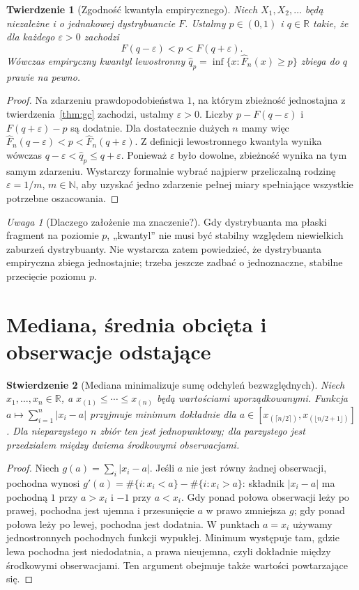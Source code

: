 \documentclass[11pt,a4paper,oneside]{report}
\numberwithin{equation}{chapter}
\theoremstyle{plain}
\newtheorem{twierdzenie}{Twierdzenie}[chapter]
\newtheorem{stwierdzenie}[twierdzenie]{Stwierdzenie}
\theoremstyle{definition}
\theoremstyle{remark}
\newtheorem{uwaga}{Uwaga}[chapter]
\newcommand{\R}{\mathbb R}
\newcommand{\N}{\mathbb N}
\newcommand{\abs}[1]{\lvert#1\rvert}
\begin{document}
\begin{twierdzenie}[Zgodność kwantyla empirycznego]\label{thm:quant-consistency}
Niech $X_1,X_2,\ldots$ będą niezależne i o jednakowej dystrybuancie $F$. Ustalmy $p\in(0,1)$ i $q\in\R$ takie, że dla każdego $\varepsilon>0$ zachodzi
\[
F(q-\varepsilon)<p<F(q+\varepsilon).
\]
Wówczas empiryczny kwantyl lewostronny $\widehat q_p=\inf\{x:\widehat F_n(x)\ge p\}$ zbiega do $q$ prawie na pewno.
\end{twierdzenie}
\begin{proof}
Na zdarzeniu prawdopodobieństwa $1$, na którym zbieżność jednostajna z twierdzenia~\ref{thm:gc} zachodzi, ustalmy $\varepsilon>0$. Liczby $p-F(q-\varepsilon)$ i $F(q+\varepsilon)-p$ są dodatnie. Dla dostatecznie dużych $n$ mamy więc $\widehat F_n(q-\varepsilon)<p<\widehat F_n(q+\varepsilon)$. Z definicji lewostronnego kwantyla wynika wówczas $q-\varepsilon<\widehat q_p\le q+\varepsilon$. Ponieważ $\varepsilon$ było dowolne, zbieżność wynika na tym samym zdarzeniu. Wystarczy formalnie wybrać najpierw przeliczalną rodzinę $\varepsilon=1/m$, $m\in\N$, aby uzyskać jedno zdarzenie pełnej miary spełniające wszystkie potrzebne oszacowania.
\end{proof}

\begin{uwaga}[Dlaczego założenie ma znaczenie?]
Gdy dystrybuanta ma płaski fragment na poziomie $p$, „kwantyl” nie musi być stabilny względem niewielkich zaburzeń dystrybuanty. Nie wystarcza zatem powiedzieć, że dystrybuanta empiryczna zbiega jednostajnie; trzeba jeszcze zadbać o jednoznaczne, stabilne przecięcie poziomu $p$.
\end{uwaga}

\section{Mediana, średnia obcięta i obserwacje odstające}\label{sec:robust}
\begin{stwierdzenie}[Mediana minimalizuje sumę odchyleń bezwzględnych]\label{prop:median-min}
Niech $x_1,\ldots,x_n\in\R$, a $x_{(1)}\le\cdots\le x_{(n)}$ będą wartościami uporządkowanymi. Funkcja $a\mapsto\sum_{i=1}^n\abs{x_i-a}$ przyjmuje minimum dokładnie dla $a\in[x_{(\lceil n/2\rceil)},x_{(\lfloor n/2+1\rfloor)}]$. Dla nieparzystego $n$ zbiór ten jest jednopunktowy; dla parzystego jest przedziałem między dwiema środkowymi obserwacjami.
\end{stwierdzenie}
\begin{proof}
Niech $g(a)=\sum_i\abs{x_i-a}$. Jeśli $a$ nie jest równy żadnej obserwacji, pochodna wynosi $g'(a)=\#\{i:x_i<a\}-\#\{i:x_i>a\}$: składnik $\abs{x_i-a}$ ma pochodną $1$ przy $a>x_i$ i $-1$ przy $a<x_i$. Gdy ponad połowa obserwacji leży po prawej, pochodna jest ujemna i przesunięcie $a$ w prawo zmniejsza $g$; gdy ponad połowa leży po lewej, pochodna jest dodatnia. W punktach $a=x_i$ używamy jednostronnych pochodnych funkcji wypukłej. Minimum występuje tam, gdzie lewa pochodna jest niedodatnia, a prawa nieujemna, czyli dokładnie między środkowymi obserwacjami. Ten argument obejmuje także wartości powtarzające się.
\end{proof}
\end{document}

